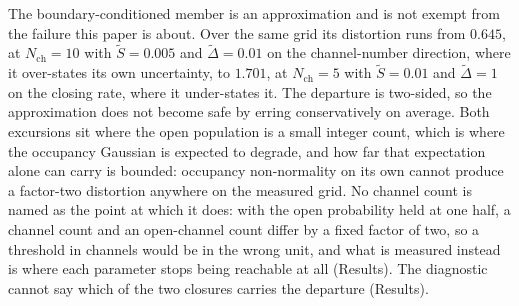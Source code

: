 The boundary-conditioned member is an approximation and is not exempt from the failure this paper is about. Over the same grid its distortion runs from $0.645$, at $N_{\mathrm{ch}}=10$ with $\widetilde{S} = 0.005$ and $\widetilde{\Delta}=0.01$ on the channel-number direction, where it over-states its own uncertainty, to $1.701$, at $N_{\mathrm{ch}}=5$ with $\widetilde{S} = 0.01$ and $\widetilde{\Delta}=1$ on the closing rate, where it under-states it. %
The departure is two-sided, so the approximation does not become safe by erring conservatively on average.
Both excursions sit where the open population is a small integer count, which is where the occupancy Gaussian is expected to degrade, and how far that expectation alone can carry is bounded: occupancy non-normality on its own cannot produce a factor-two distortion anywhere on the measured grid. No channel count is named as the point at which it does: with the open probability held at one half, a channel count and an open-channel count differ by a fixed factor of two, so a threshold in channels would be in the wrong unit, and what is measured instead is where each parameter stops being reachable at all (Results). The diagnostic cannot say which of the two closures carries the departure (Results).

